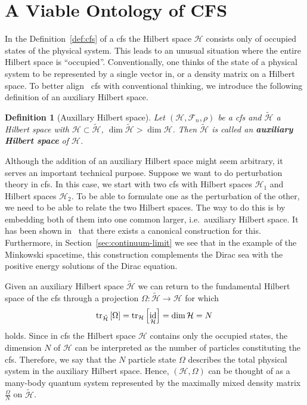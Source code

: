 \documentclass[reqno,11pt]{amsart}
\DeclareMathOperator{\id}{id}
\renewcommand{\H}{\mathcal{H}}
\newcommand{\F}{{\mathcal{F}}}
\newtheorem{definition}{Definition}[section]
\numberwithin{equation}{section}
\begin{document}
\section{A Viable Ontology of CFS} \label{sec:ontology-of-cfs}

In the Definition~\ref{def:cfs} of a \ac{cfs} the Hilbert space $\H$ consists only of occupied states of the physical system.
This leads to an unusual situation where the entire Hilbert space is ``occupied''.
Conventionally, one thinks of the state of a physical system to be represented by a single vector in, or a density matrix
on a Hilbert space.
To better align ~\ac{cfs} with conventional thinking, we introduce the following definition of an auxiliary Hilbert space.

\begin{definition}[Auxillary Hilbert space]
    Let $(\H, \F_n, \rho)$ be a \ac{cfs} and $\tilde{\H}$ a Hilbert space with $\H \subset \tilde{\H}$, $\dim {\tilde{\H}} > \dim {\H}$.
    Then $\tilde{\H}$ is called an \textbf{auxiliary Hilbert space} of $\H$.
\end{definition}

Although the addition of an auxiliary Hilbert space might seem arbitrary, it serves an important technical purpose.
Suppose we want to do perturbation theory in \ac{cfs}.
In this case, we start with two \ac{cfs} with Hilbert spaces $\H_1$ and Hilbert spaces $\H_2$.
To be able to formulate one as the perturbation of the other, we need to be able to relate the two Hilbert spaces.
The way to do this is by embedding both of them into one common larger, i.e.~auxiliary Hilbert space.
It has been shown in~\cite{Finster2025} that there exists a canonical construction for this.
Furthermore, in Section~\ref{sec:continuum-limit} we see that in the example of the Minkowski spacetime, this construction
complements the Dirac sea with the positive energy solutions of the Dirac equation.

Given an auxiliary Hilbert space $\tilde{\H}$ we can return to the fundamental Hilbert space of the \ac{cfs} through a projection  $\Omega: \tilde{\H} \to \H$ for which
\begin{align*}
    \tr_{\tilde{\H}} \left[ \Omega \right] = \tr_\H \left[ \id_\H \right] = \dim \H = N \,
\end{align*}
holds.
Since in \ac{cfs} the Hilbert space $\H$ contains only the occupied states, the dimension $N$ of $\H$ can be interpreted as the number of particles constituting the \ac{cfs}.
Therefore, we say that the $N$ particle state $\Omega$ describes the total physical system in the auxiliary Hilbert space.
Hence, $(\H, \Omega)$ can be thought of as a many-body quantum system represented by the maximally mixed
density matrix $\frac{\Omega}{N}$ on $\tilde{\H}$.
\end{document}
